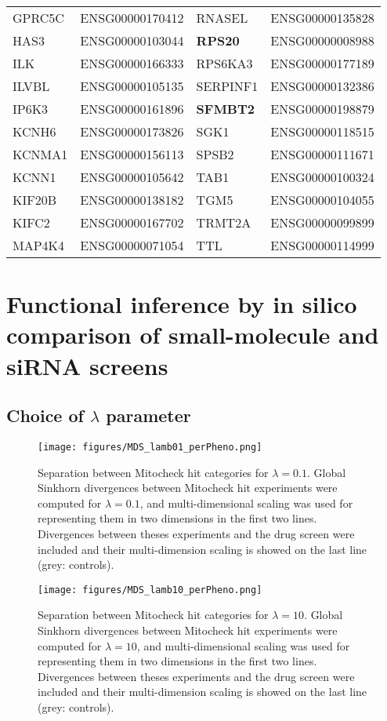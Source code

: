 \begin{table}[!ht]
\begin{tabular}{|l|l||l|l|}
GPRC5C  &  ENSG00000170412  &  RNASEL  &  ENSG00000135828  \\
HAS3  &  ENSG00000103044  &  \textbf{RPS20 } &  ENSG00000008988  \\
ILK  &  ENSG00000166333  &  RPS6KA3  &  ENSG00000177189  \\
ILVBL  &  ENSG00000105135  &  SERPINF1  &  ENSG00000132386  \\
IP6K3  &  ENSG00000161896  &  \textbf{SFMBT2}  &  ENSG00000198879  \\
KCNH6  &  ENSG00000173826  &  SGK1  &  ENSG00000118515  \\
KCNMA1  &  ENSG00000156113  &  SPSB2  &  ENSG00000111671  \\
KCNN1  &  ENSG00000105642  &  TAB1  &  ENSG00000100324  \\
KIF20B  &  ENSG00000138182  &  TGM5  &  ENSG00000104055  \\
KIFC2  &  ENSG00000167702  &  TRMT2A  &  ENSG00000099899  \\
MAP4K4  &  ENSG00000071054  &  TTL  &  ENSG00000114999  \\

\hline
\end{tabular}
\end{table}
\clearpage
\section{Functional inference by in silico comparison of small-molecule and siRNA screens}
\subsection{Choice of $\lambda$ parameter}
\label{choice_param_Sinkhorn}
\begin{figure*}[ht!]
\centerline{
\texttt{[image: figures/MDS\_lamb01\_perPheno.png]}
}
\caption{Separation between Mitocheck hit categories for $\lambda=0.1$. Global Sinkhorn divergences between Mitocheck hit experiments were computed for $\lambda=0.1$, and multi-dimensional scaling was used for representing them in two dimensions in the first two lines. Divergences between theses experiments and the drug screen were included and their multi-dimension scaling is showed on the last line (grey: controls).}
\label{lambda_choice2}
\end{figure*}
\begin{figure*}[ht!]
\centerline{
\texttt{[image: figures/MDS\_lamb10\_perPheno.png]}}
\caption{Separation between Mitocheck hit categories for $\lambda=10$. Global Sinkhorn divergences between Mitocheck hit experiments were computed for $\lambda=10$, and multi-dimensional scaling was used for representing them in two dimensions in the first two lines. Divergences between theses experiments and the drug screen were included and their multi-dimension scaling is showed on the last line (grey: controls).}
\label{lambda_choice3}
\end{figure*}
\clearpage

